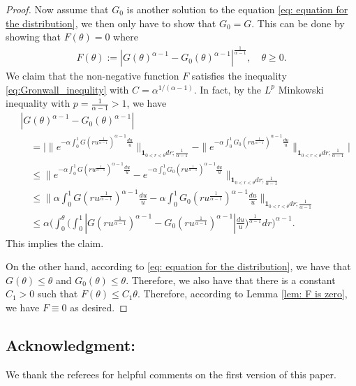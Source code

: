 \documentclass[12pt,a4paper]{amsart}
\theoremstyle{definition}
\numberwithin{equation}{section}
\begin{document}
\begin{proof}
Now assume that $G_0$ is another solution to the equation \eqref{eq: equation for the distribution}, we then only have to show that $G_0 = G$.
This can be done by showing that $F(\theta) = 0$ where
  \begin{align}
    F(\theta)
    := |G(\theta)^{\alpha - 1} - G_0(\theta)^{\alpha - 1}|^{\frac{1}{\alpha - 1}},
    \quad \theta \geq 0.
  \end{align}
  We claim that the non-negative function $F$ satisfies the inequality \eqref{eq:Gronwall_inequlity} with $C = \alpha ^{1/(\alpha - 1)}$.
	In fact, by the $L^p$ Minkowski inequality with $p = \frac{1}{\alpha - 1} > 1$, we have
  \begin{align}
    &|G(\theta)^{\alpha - 1} - G_0(\theta)^{\alpha - 1}|
    \\&\quad = \Big| \|e^{-\alpha \int_0^1 G(ru^{\frac{1}{\alpha - 1}})^{\alpha - 1} \frac{du}{u}} \|_{\mathbf 1_{0<r<\theta} dr; \frac{1}{\alpha - 1}} - \|e^{-\alpha \int_0^1 G_0(ru^{ \frac{1} {\alpha - 1}})^{\alpha - 1} \frac{du}{u}} \|_{\mathbf 1_{0<r<\theta}dr;\frac{1}{\alpha - 1}} \Big|
    \\ & \quad \leq \| e^{-\alpha \int_0^1 G(ru^{\frac{1}{\alpha - 1}})^{\alpha - 1} \frac{du}{u}} - e^{-\alpha \int_0^1 G_0(ru^{\frac{1}{\alpha - 1}})^{\alpha - 1} \frac{du}{u}} \|_{\mathbf 1_{0<r<\theta}dr;\frac{1} {\alpha - 1}}
    \\ & \quad \leq \Big\| \alpha \int_0^1 G(ru^{\frac{1}{\alpha - 1}})^{\alpha - 1} \frac{du}{u} - \alpha \int_0^1 G_0(ru^{\frac{1}{\alpha - 1}})^{\alpha - 1} \frac{du}{u} \Big\|_{\mathbf 1_{0<r<\theta}dr;\frac{1} {\alpha - 1}}
    \\ & \quad \leq \alpha \Bigg( \int_0^\theta \Big( \int_0^1 |G(ru^{\frac{1}{\alpha - 1}})^{\alpha - 1} - G_0(ru^{\frac{1}{\alpha - 1}})^{\alpha - 1}| \frac{du}{u} \Big)^{\frac{1}{\alpha - 1}} dr \Bigg)^{\alpha - 1}.
  \end{align}
  This implies the claim.

  On the other hand, according to \eqref{eq: equation for the distribution}, we have that $G(\theta) \leq \theta$ and $G_0(\theta) \leq \theta$.
  Therefore, we also have that there is a constant $C_1 > 0$ such that $F(\theta) \leq C_1 \theta$.
  Therefore, according to Lemma \ref{lem: F is zero}, we have $F \equiv 0$ as desired.
\end{proof}

\subsection*{Acknowledgment:}
We thank the referees for helpful comments on the first version of this paper.
\end{document}
